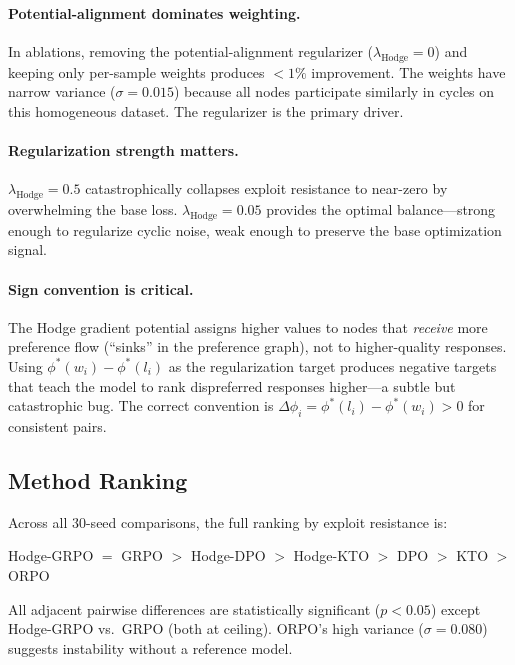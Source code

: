 \documentclass{article}
\begin{document}
\paragraph{Potential-alignment dominates weighting.} In ablations, removing the potential-alignment regularizer ($\lambda_\text{Hodge} = 0$) and keeping only per-sample weights produces $< 1\%$ improvement. The weights have narrow variance ($\sigma = 0.015$) because all nodes participate similarly in cycles on this homogeneous dataset. The regularizer is the primary driver.

\paragraph{Regularization strength matters.} $\lambda_\text{Hodge} = 0.5$ catastrophically collapses exploit resistance to near-zero by overwhelming the base loss. $\lambda_\text{Hodge} = 0.05$ provides the optimal balance---strong enough to regularize cyclic noise, weak enough to preserve the base optimization signal.

\paragraph{Sign convention is critical.} The Hodge gradient potential assigns higher values to nodes that \emph{receive} more preference flow (``sinks'' in the preference graph), not to higher-quality responses. Using $\phi^*(w_i) - \phi^*(l_i)$ as the regularization target produces negative targets that teach the model to rank dispreferred responses higher---a subtle but catastrophic bug. The correct convention is $\Delta\phi_i = \phi^*(l_i) - \phi^*(w_i) > 0$ for consistent pairs.

\subsection{Method Ranking}

Across all 30-seed comparisons, the full ranking by exploit resistance is:

\begin{center}
Hodge-GRPO $=$ GRPO $>$ Hodge-DPO $>$ Hodge-KTO $>$ DPO $>$ KTO $>$ ORPO
\end{center}

All adjacent pairwise differences are statistically significant ($p < 0.05$) except Hodge-GRPO vs.\ GRPO (both at ceiling). ORPO's high variance ($\sigma = 0.080$) suggests instability without a reference model.
\end{document}
